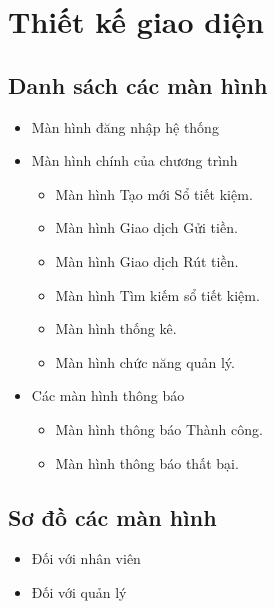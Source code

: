 \documentclass{article}
\begin{document}
\begin{itemize}
\begin{itemize}
				\end{itemize}
			
		\end{itemize}

	\newpage
	\section{Thiết kế giao diện}
	\subsection{Danh sách các màn hình}
	
		\begin{itemize}
			\item Màn hình đăng nhập hệ thống
			\item Màn hình chính của chương trình
			
				\begin{itemize}
					\item Màn hình Tạo mới Sổ tiết kiệm.
					\item Màn hình Giao dịch Gửi tiền.
					\item Màn hình Giao dịch Rút tiền.
					\item Màn hình Tìm kiếm sổ tiết kiệm.
					\item Màn hình thống kê.
					\item Màn hình chức năng quản lý.
				\end{itemize}
			
			\item Các màn hình thông báo
				\begin{itemize}
					\item Màn hình thông báo Thành công.
					\item Màn hình thông báo thất bại.
				\end{itemize}
			
		\end{itemize}
	
	
	\subsection{Sơ đồ các màn hình}
	
		\begin{itemize}
			
			\item Đối với nhân viên
			
			\item Đối với quản lý
			
		\end{itemize}
	
\end{document}
